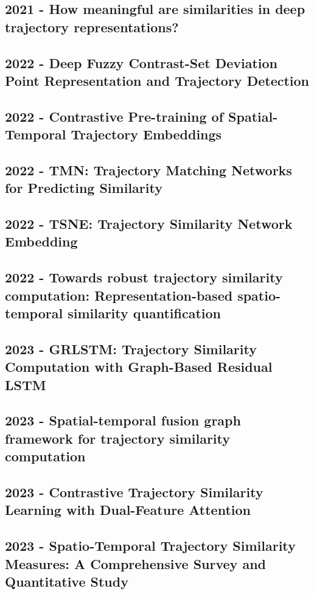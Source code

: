 \subsection*{2021 - How meaningful are similarities in deep trajectory representations?}
\cite{taghizadeh2021meaningful}

\subsection*{2022 - Deep Fuzzy Contrast-Set Deviation Point Representation and Trajectory Detection}
\cite{ahmed2022deep}

\subsection*{2022 - Contrastive Pre-training of Spatial-Temporal Trajectory Embeddings}
\cite{lin2022contrastive}

\subsection*{2022 - TMN: Trajectory Matching Networks for Predicting Similarity}
\cite{yang2022tmn}

\subsection*{2022 - TSNE: Trajectory Similarity Network Embedding}
\cite{ding2022tsne}

\subsection*{2022 - Towards robust trajectory similarity computation: Representation-based spatio-temporal similarity quantification}
\cite{chen2022towards}

\subsection*{2023 - GRLSTM: Trajectory Similarity Computation with Graph-Based Residual LSTM}
\cite{zhou2023grlstm}

\subsection*{2023 - Spatial-temporal fusion graph framework for trajectory similarity computation}
\cite{zhou2023spatial}

\subsection*{2023 - Contrastive Trajectory Similarity Learning with Dual-Feature Attention}
\cite{chang2023contrastive}

\subsection*{2023 - Spatio-Temporal Trajectory Similarity Measures: A Comprehensive Survey and Quantitative Study}
\cite{hu2023spatio}